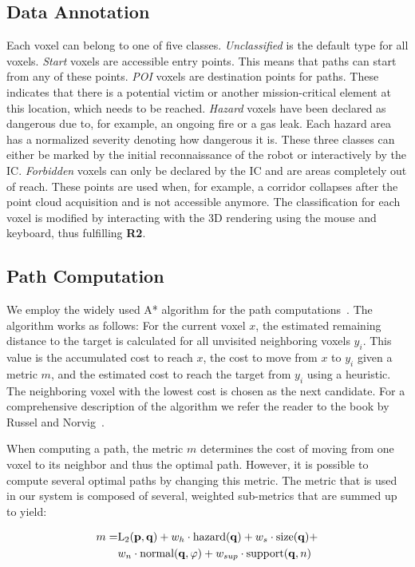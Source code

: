 \documentclass{egpubl}
\begin{document}
\subsection{Data Annotation} \label{sec:overview:annotation}
Each voxel can belong to one of five classes. \emph{Unclassified} is the default type for all voxels. \emph{Start} voxels are accessible entry points. This means that paths can start from any of these points. \emph{POI} voxels are destination points for paths. These indicates that there is a potential victim or another mission-critical element at this location, which needs to be reached. \emph{Hazard} voxels have been declared as dangerous due to, for example, an ongoing fire or a gas leak. Each hazard area has a normalized severity denoting how dangerous it is. These three classes can either be marked by the initial reconnaissance of the robot or interactively by the IC. \emph{Forbidden} voxels can only be declared by the IC and are areas completely out of reach. These points are used when, for example, a corridor collapses after the point cloud acquisition and is not accessible anymore. The classification for each voxel is modified by interacting with the 3D rendering using the mouse and keyboard, thus fulfilling {\bfseries R2}. 

\subsection{Path Computation} \label{sec:overview:pathcomputation}
We employ the widely used A* algorithm for the path computations~\cite{4082128}. The algorithm works as follows: For the current voxel $x$, the estimated remaining distance to the target is calculated for all unvisited neighboring voxels $y_i$. This value is the accumulated cost to reach $x$, the cost to move from $x$ to $y_i$ given a metric $m$, and the estimated cost to reach the target from $y_i$ using a heuristic. The neighboring voxel with the lowest cost is chosen as the next candidate. For a comprehensive description of the algorithm we refer the reader to the book by Russel and Norvig~\cite{AStar}.

When computing a path, the metric $m$ determines the cost of moving from one voxel to its neighbor and thus the optimal path. However, it is possible to compute several optimal paths by changing this metric. The metric that is used in our system is composed of several, weighted sub-metrics that are summed up to yield:

\begin{equation}
\begin{array}{r@{}l}
m = & \textrm{L}_2(\mathbf{p},\mathbf{q}) + w_h \cdot \textrm{hazard}(\mathbf{q}) + w_s \cdot \textrm{size}(\mathbf{q}) + \vspace*{0.1cm} \\
  & w_n \cdot \textrm{normal}(\mathbf{q},\varphi) + w_{sup} \cdot \textrm{support}(\mathbf{q},n)
\end{array}
\end{equation}
\end{document}
